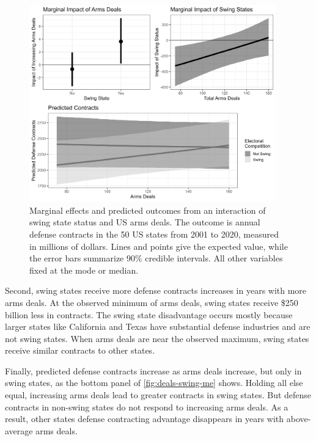 \documentclass[12pt]{article}
\begin{document}
\begin{figure}[htpb]
	\centering
		\includegraphics[width=0.95\textwidth]{../figures/deals-swing-me.png}
	\caption{Marginal effects and predicted outcomes from an interaction of swing state status and US arms deals. The outcome is annual defense contracts in the 50 US states from 2001 to 2020, measured in millions of dollars. Lines and points give the expected value, while the error bars summarize 90\% credible intervals. All other variables fixed at the mode or median.}
	\label{fig:deals-swing-me}
\end{figure}


Second, swing states receive more defense contracts increases in years with more arms deals. 
At the observed minimum of arms deals, swing states receive \$250 billion less in contracts.
The swing state disadvantage occurs mostly because larger states like California and Texas have substantial defense industries and are not swing states.
When arms deals are near the observed maximum, swing states receive similar contracts to other states. 


Finally, predicted defense contracts increase as arms deals increase, but only in swing states, as the bottom panel of \autoref{fig:deals-swing-me} shows. 
Holding all else equal, increasing arms deals lead to greater contracts in swing states. 
But defense contracts in non-swing states do not respond to increasing arms deals.
As a result, other states defense contracting advantage disappears in years with above-average arms deals. 
\end{document}
